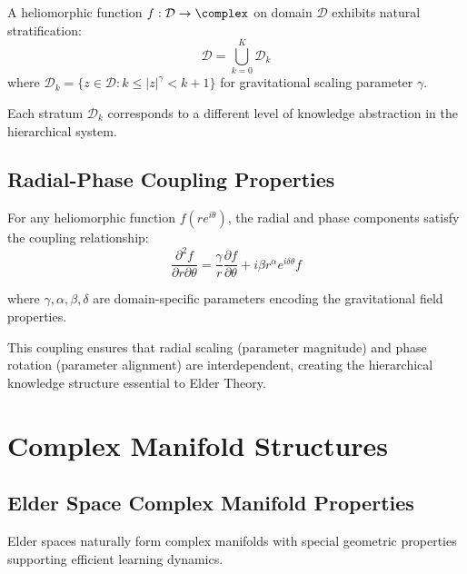 \begin{definition}
\label{def:heliomorphic_stratification}
A heliomorphic function $f: \mathcal{D} \rightarrow \complex$ on domain $\mathcal{D}$ exhibits natural stratification:
\begin{equation}
\mathcal{D} = \bigcup_{k=0}^{K} \mathcal{D}_k
\end{equation}
where $\mathcal{D}_k = \{z \in \mathcal{D} : k \leq |z|^{\gamma} < k+1\}$ for gravitational scaling parameter $\gamma$.

Each stratum $\mathcal{D}_k$ corresponds to a different level of knowledge abstraction in the hierarchical system.
\end{definition}

\subsection{Radial-Phase Coupling Properties}

\begin{theorem}
\label{thm:heliomorphic_coupling}
For any heliomorphic function $f(re^{i\theta})$, the radial and phase components satisfy the coupling relationship:
\begin{equation}
\frac{\partial^2 f}{\partial r \partial \theta} = \frac{\gamma}{r} \frac{\partial f}{\partial \theta} + i\beta r^{\alpha} e^{i\delta\theta} f
\end{equation}

where $\gamma, \alpha, \beta, \delta$ are domain-specific parameters encoding the gravitational field properties.

This coupling ensures that radial scaling (parameter magnitude) and phase rotation (parameter alignment) are interdependent, creating the hierarchical knowledge structure essential to Elder Theory.
\end{theorem}

\section{Complex Manifold Structures}

\subsection{Elder Space Complex Manifold Properties}

Elder spaces naturally form complex manifolds with special geometric properties supporting efficient learning dynamics.

